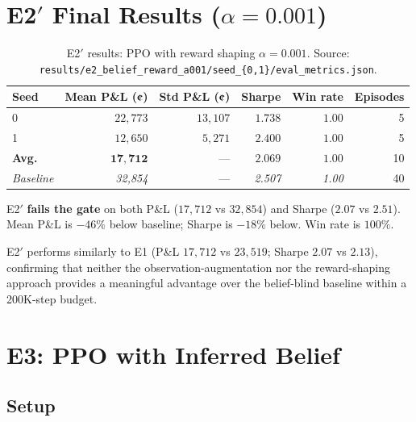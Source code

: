 \documentclass[11pt]{article}
\begin{document}
\section{E2$'$ Final Results ($\alpha=0.001$)}

\begin{table}[H]
\centering
\begin{tabular}{lrrrrr}
\toprule
\textbf{Seed} &
\textbf{Mean P\&L (¢)} &
\textbf{Std P\&L (¢)} &
\textbf{Sharpe} &
\textbf{Win rate} &
\textbf{Episodes} \\
\midrule
0 & $22{,}773$ & $13{,}107$ & $1.738$ & $1.00$ & 5 \\
1 & $12{,}650$ & $\phantom{0}5{,}271$ & $2.400$ & $1.00$ & 5 \\
\midrule
\textbf{Avg.} & $\mathbf{17{,}712}$ & --- & $\mathbf{2.069}$ & $\mathbf{1.00}$ & 10 \\
\midrule
\textit{Baseline} & \textit{32,854} & --- & \textit{2.507} & \textit{1.00} & 40 \\
\bottomrule
\end{tabular}
\caption{E2$'$ results: PPO with reward shaping $\alpha=0.001$.
         Source: \texttt{results/e2\_belief\_reward\_a001/seed\_\{0,1\}/eval\_metrics.json}.}
\label{tab:e2a001final}
\end{table}

E2$'$ \textbf{fails the gate} on both P\&L ($17{,}712$ vs $32{,}854$) and
Sharpe ($2.07$ vs $2.51$).
Mean P\&L is $-46\%$ below baseline; Sharpe is $-18\%$ below.
Win rate is $100\%$.

E2$'$ performs similarly to E1 (P\&L $17{,}712$ vs $23{,}519$; Sharpe $2.07$
vs $2.13$), confirming that neither the observation-augmentation nor the
reward-shaping approach provides a meaningful advantage over the belief-blind
baseline within a 200K-step budget.

\section{E3: PPO with Inferred Belief}

\subsection{Setup}
\end{document}
